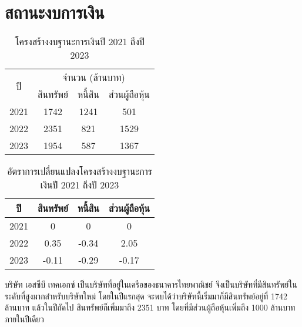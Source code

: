 \section{สถานะงบการเงิน}
\begin{table}[H]
  \centering
  \begin{tabular}{c||c|c|c}
      \multirow{2}{*}{ปี} & \multicolumn{3}{c}{จำนวน (ล้านบาท)} \\
      \cline{2-4}
       & \hspace{2pt} สินทรัพย์ \hspace{2pt} & \hspace{2pt} หนี้สิน \hspace{2pt} & \hspace{2pt} ส่วนผู้ถือหุ้น \hspace{2pt} \\
      \hline\hline
      2021 & 1742 & 1241 & 501 \\
      2022 & 2351 & 821  & 1529\\
      2023 & 1954 & 587  & 1367\\
  \end{tabular}
  \caption{โครงสร้างงบฐานะการเงินปี 2021 ถึงปี 2023}
  \label{tab:company-asset-table-1}
\end{table}
\begin{table}[H]
  \centering
  \begin{tabular}{c||c|c|c}
       ปี & \hspace{2pt} สินทรัพย์ \hspace{2pt} & \hspace{2pt} หนี้สิน \hspace{2pt} & \hspace{2pt} ส่วนผู้ถือหุ้น \hspace{2pt} \\
      \hline\hline
      2021 & 0 & 0  & 0 \\
      2022 & 0.35 & -0.34  & 2.05\\
      2023 & -0.11 & -0.29  & -0.17\\
  \end{tabular}
  \caption{อัตราการเปลี่ยนแปลงโครงสร้างงบฐานะการเงินปี 2021 ถึงปี 2023}
  \label{tab:company-asset-table-2}
\end{table}
บริษัท เอสซีบี เทคเอกซ์ เป็นบริษัทที่อยู่ในเครือของธนาคารไทยพาณิชย์ จึงเป็นบริษัทที่มีสินทรัพย์ในระดับที่สูงมากสำหรับบริษัทใหม่ โดยในปีแรกสุด จะพบได้ว่าบริษัทนี้เริ่มมาก็มีสินทรัพย์อยู่ที่ 1742 ล้านบาท แล้วในปีถัดไป สินทรัพย์ก็เพิ่มมาถึง 2351 บาท โดยที่มีส่วนผู้ถือหุ้นเพิ่มถึง 1000 ล้านบาทภายในปีเดียว
